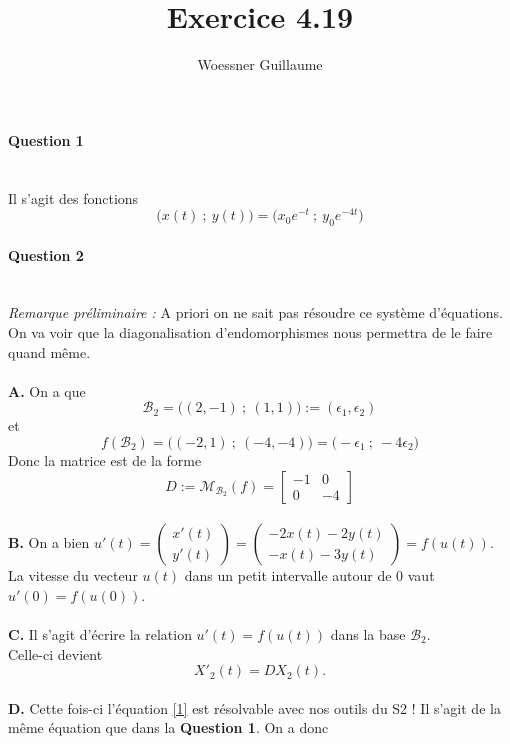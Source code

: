 \documentclass[12pt]{article}
\author{Woessner Guillaume}
\title{Exercice 4.19}         %
\date{}                       %
\begin{document}
\maketitle                %

\paragraph{Question 1}~\\
Il s'agit des fonctions 
$$\Big(x(t)~;~y(t)\Big) = \Big( x_0e^{-t}~;~y_0e^{-4t}\Big)$$

\paragraph{Question 2}~\\
\emph{Remarque préliminaire :} A priori on ne sait pas résoudre ce système d'équations. On va voir que la diagonalisation d'endomorphismes nous permettra de le faire quand même.\\
~\\
\textbf{A.} On a que 
$$\mathcal{B}_2 = \Big( (2,-1) ~;~ (1,1) \Big) := (\epsilon_1,\epsilon_2) $$
et 
$$f(\mathcal{B}_2) = \Big( (-2,1) ~;~ (-4,-4) \Big) = \Big( -\epsilon_1 ~;~ -4\epsilon_2 \Big)$$
Donc la matrice est de la forme 
$$ D:= \mathcal{M}_{\mathcal{B}_2}(f) = 
\begin{bmatrix}
-1 & 0\\
0 & -4
\end{bmatrix}$$
~\\
\noindent \textbf{B.} On a bien $u'(t) = \begin{pmatrix} x'(t)\\ y'(t) \end{pmatrix} = \begin{pmatrix} -2x(t)-2y(t)\\ -x(t)-3y(t) \end{pmatrix} = f(u(t))$.\\
La vitesse du vecteur $u(t)$ dans un petit intervalle autour de $0$ vaut $u'(0)=f(u(0))$.\\
~\\
\noindent \textbf{C.} Il s'agit d'écrire la relation $u'(t)=f(u(t))$ dans la base $\mathcal{B}_2$.\\Celle-ci devient
\begin{equation}
\label{1} X'_2(t) = D X_2(t).
\end{equation} 
~\\
\noindent \textbf{D.} Cette fois-ci l'équation \eqref{1} est résolvable avec nos outils du S2 ! Il s'agit de la même équation que dans la \textbf{Question 1}. On a donc
\end{document}
